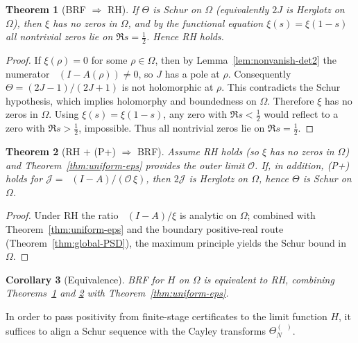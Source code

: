 \documentclass[11pt]{article}
\newtheorem{theorem}{Theorem}
\newtheorem{corollary}[theorem]{Corollary}
\theoremstyle{remark}
\DeclareMathOperator{\dettwo}{det_2}
\begin{document}
\begin{theorem}[BRF \(\Rightarrow\) RH]\label{thm:brf-implies-rh}
If \(\Theta\) is Schur on \(\Omega\) (equivalently $2J$ is Herglotz on \(\Omega\)), then \(\xi\) has no zeros in \(\Omega\), and by the functional equation \(\xi(s)=\xi(1-s)\) all nontrivial zeros lie on \(\Re s=\tfrac12\). Hence RH holds.
\end{theorem}
\begin{proof}
If \(\xi(\rho)=0\) for some \(\rho\in\Omega\), then by Lemma~\ref{lem:nonvanish-det2} the numerator \(\dettwo(I-A(\rho))\ne 0\), so \(J\) has a pole at \(\rho\). Consequently \(\Theta=(2J-1)/(2J+1)\) is not holomorphic at \(\rho\). This contradicts the Schur hypothesis, which implies holomorphy and boundedness on \(\Omega\). Therefore \(\xi\) has no zeros in \(\Omega\). Using \(\xi(s)=\xi(1-s)\), any zero with \(\Re s<\tfrac12\) would reflect to a zero with \(\Re s>\tfrac12\), impossible. Thus all nontrivial zeros lie on \(\Re s=\tfrac12\).
\end{proof}
\begin{theorem}[RH $+$ (P+) \(\Rightarrow\) BRF]\label{thm:rh-implies-brf}
Assume RH holds (so \(\xi\) has no zeros in \(\Omega\)) and Theorem~\ref{thm:uniform-eps} provides the outer limit \(\mathcal O\). If, in addition, (P+) holds for \(\mathcal J=\dettwo(I-A)/(\mathcal O\,\xi)\), then \(2\mathcal J\) is Herglotz on \(\Omega\), hence \(\Theta\) is Schur on \(\Omega\).
\end{theorem}
\begin{proof}
Under RH the ratio \(\dettwo(I-A)/\xi\) is analytic on \(\Omega\); combined with Theorem~\ref{thm:uniform-eps} and the boundary positive-real route (Theorem~\ref{thm:global-PSD}), the maximum principle yields the Schur bound in \(\Omega\).
\end{proof}
\begin{corollary}[Equivalence]
BRF for $H$ on \(\Omega\) is equivalent to RH, combining Theorems~\ref{thm:brf-implies-rh} and \ref{thm:rh-implies-brf} with Theorem~\ref{thm:uniform-eps}.
\end{corollary}

In order to pass positivity from finite-stage certificates to the limit function \(H\), it suffices to align a Schur sequence with the Cayley transforms \(\Theta_N^{(\dettwo)}\).
\end{document}
